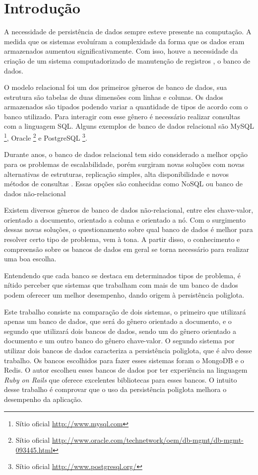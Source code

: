 \chapter{Introdução}\label{chap:introducao}
A necessidade de persistência de dados sempre esteve presente na computação. A medida que os sistemas evoluíram a complexidade da forma que os dados eram armazenados aumentou significativamente. Com isso, houve a necessidade da criação de um sistema computadorizado de manutenção de registros \cite{CJDate}, o banco de dados.

O modelo relacional foi um dos primeiros gêneros de banco de dados, sua estrutura são tabelas de duas dimensões com linhas e colunas. Os dados armazenados são tipados podendo variar a quantidade de tipos de acordo com o banco utilizado. Para interagir com esse gênero é necessário realizar consultas com a linguagem \ac{SQL}. Alguns exemplos de banco de dados relacional são MySQL \footnote{Sítio oficial  \url{http://www.mysql.com}}, Oracle \footnote{Sítio oficial  \url{http://www.oracle.com/technetwork/oem/db-mgmt/db-mgmt-093445.html}} e PostgreSQL \footnote{Sítio oficial \url{http://www.postgresql.org/}}.

Durante anos, o banco de dados relacional tem sido considerado a melhor opção para os problemas de escalabilidade, porém surgiram novas soluções com novas alternativas de estruturas, replicação simples, alta disponibilidade e novos métodos de consultas \cite{SDSW}. Essas opções são conhecidas como NoSQL ou banco de dados não-relacional

Existem diversos gêneros de banco de dados não-relacional, entre eles chave-valor, orientado a documento, orientado a coluna e orientado a nó. Com o surgimento dessas novas soluções, o questionamento sobre qual banco de dados é melhor para resolver certo tipo de problema, vem à tona. A partir disso, o conhecimento e compreensão sobre os bancos de dados em geral se torna necessário para realizar uma boa escolha.

Entendendo que cada banco se destaca em determinados tipos de problema, é nítido perceber que sistemas que trabalham com mais de um banco de dados podem oferecer um melhor desempenho, dando origem à persistência poliglota.

Este trabalho consiste na comparação de dois sistemas, o primeiro que utilizará apenas um banco de dados, que será do gênero orientado a documento, e o segundo que utilizará dois bancos de dados, sendo um do gênero orientado a documento e um outro banco do gênero chave-valor. O segundo sistema por utilizar dois bancos de dados caracteriza a persistência poliglota, que é alvo desse trabalho. Os bancos escolhidos para fazer esses sistemas foram o MongoDB e o \ac{Redis}. O autor escolheu esses bancos de dados por ter experiência na linguagem \textit{Ruby on Rails} que oferece excelentes bibliotecas para esses bancos. O intuito desse trabalho é comprovar que o uso da persistência poliglota melhora o desempenho da aplicação.

